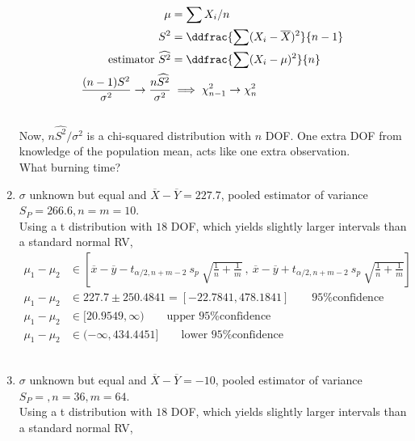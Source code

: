 \begin{enumerate}
	
		\begin{align}
			\mu &= \sum X_i / n \nonumber \\
			S^2 &= \ddfrac{\sum (X_i - \overline{X})^2}{n-1} \nonumber \\
			\text{estimator } \widehat{S^2} &= \ddfrac{\sum (X_i - \mu)^2}{n} \\
			\frac{(n-1)S^2}{\sigma^2} \to \frac{n\widehat{S^2}}{\sigma^2} &\implies \chi^2_{n-1} \to \chi^2_{n}
		\end{align}\\
	
	
	Now, $ n \widehat{S^2} /\sigma^2 $ is a chi-squared distribution with $ n $ DOF. One extra DOF from knowledge of the population mean, acts like one extra observation.\\
	
	What burning time?\\
	
	\item  $ \sigma $ unknown but equal and $ \overline{X} - \overline{Y} = 227.7 $, pooled estimator of variance $ S_P = 266.6, n = m = 10$. \\
	Using a t distribution with $ 18 $ DOF, which yields slightly larger intervals than a standard normal RV,\\
	
		\begin{align}
			\mu_1 - \mu_2 &\in \left[ \overline{x} - \overline{y} - t_{\alpha / 2, n+m-2}\ s_p\ \sqrt{\frac{1}{n} + \frac{1}{m}}\ ,\ \overline{x} - \overline{y} + t_{\alpha / 2, n+m-2}\ s_p\ \sqrt{\frac{1}{n} + \frac{1}{m}} \right]  \nonumber \\
			\mu_1 - \mu_2 &\in 227.7 \pm 250.4841 = [-22.7841, 478.1841] \qquad \text{95\% confidence}  \nonumber \\
			\mu_1 - \mu_2 &\in  [20.9549, \infty) \qquad \text{upper 95\% confidence} \nonumber \\
			\mu_1 - \mu_2 &\in  (-\infty, 434.4451] \qquad \text{lower 95\% confidence} \nonumber 
		\end{align}\\
	
	
	\item  $ \sigma $ unknown but equal and $ \overline{X} - \overline{Y} = -10 $, pooled estimator of variance $ S_P = , n = 36, m = 64$. \\
	Using a t distribution with $ 18 $ DOF, which yields slightly larger intervals than a standard normal RV,\\
	

\end{enumerate}
